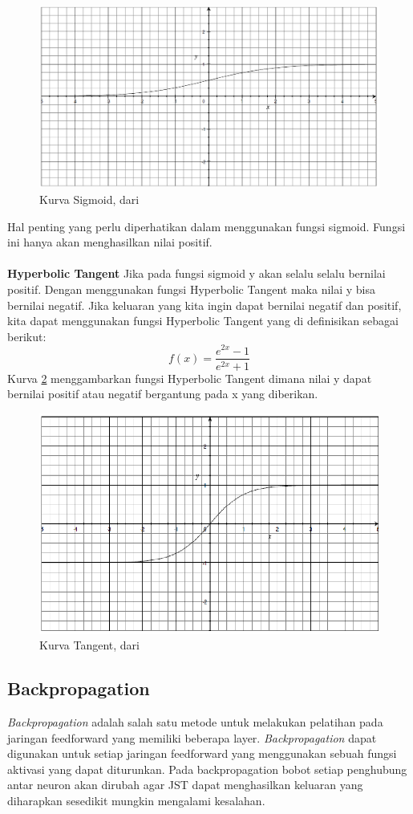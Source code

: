 \begin{enumerate}
\begin{figure}
	\centering
	\includegraphics[width=0.6\linewidth]{Gambar/mine/sigmoid}
	\caption[Kurva Sigmoid, dari \cite{IntroNNforJava:2015}]{Kurva Sigmoid, dari \cite{IntroNNforJava:2015}} 
	\label{fig:k_sigmoid}
	\end{figure}
Hal penting yang perlu diperhatikan dalam menggunakan fungsi sigmoid. Fungsi ini hanya akan menghasilkan nilai positif.\\\\
\textbf{Hyperbolic Tangent}
Jika pada fungsi sigmoid y akan selalu selalu bernilai positif. Dengan menggunakan fungsi Hyperbolic Tangent maka nilai y bisa bernilai negatif. Jika keluaran yang kita ingin dapat bernilai negatif dan positif, kita dapat menggunakan fungsi Hyperbolic Tangent yang di definisikan sebagai berikut:
\begin{displaymath}
	f(x)=\frac{e^{2x}-1}{e^{2x}+1}
\end{displaymath}
Kurva \ref{fig:k_tangent} menggambarkan fungsi Hyperbolic Tangent dimana nilai y dapat bernilai positif atau negatif bergantung pada x yang diberikan.
\begin{figure}
	\centering
	\includegraphics[width=0.6\linewidth]{Gambar/mine/tangent}
	\caption[Kurva Tangent, dari \cite{IntroNNforJava:2015}]{Kurva Tangent, dari \cite{IntroNNforJava:2015}} 
	\label{fig:k_tangent}
	\end{figure}
\end{enumerate}
\subsection{Backpropagation}
\textit{Backpropagation} adalah salah satu metode untuk melakukan pelatihan pada jaringan feedforward yang memiliki beberapa layer. \textit{Backpropagation} dapat digunakan untuk setiap jaringan feedforward yang menggunakan sebuah fungsi aktivasi yang dapat diturunkan. Pada backpropagation bobot setiap penghubung antar neuron akan dirubah agar JST dapat menghasilkan keluaran yang diharapkan sesedikit mungkin mengalami kesalahan.\\\\ 
